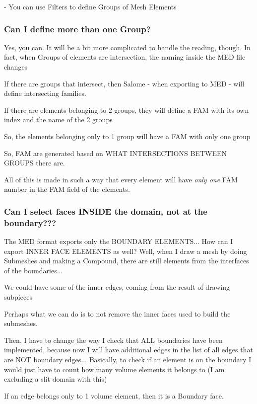 \documentclass[10pt]{book}
\begin{document}
- You can use Filters to define Groups of Mesh Elements

\subsubsection{Can I define more than one Group?}

 Yes, you can. It will be a bit more complicated to handle the reading, though.
 In fact, when Groups of elements are intersection,
 the naming inside the MED file changes
 
 If there are groups that intersect, then Salome - when exporting to MED - 
 will define intersecting families. 
 
 If there are elements belonging to 2 groups,
 they will define a FAM with its own index and the name of the 2 groups
 
 So, the elements belonging only to 1 group will have a FAM with only one group
 
 So, FAM are generated based on WHAT INTERSECTIONS BETWEEN GROUPS there are.
 
 All of this is made in such a way that every element 
 will have \textit{only one} FAM number in the FAM field of the elements.
 

\subsubsection{Can I select faces INSIDE the domain, not at the boundary???}

 The MED format exports only the BOUNDARY ELEMENTS...
 How can I export INNER FACE ELEMENTS as well?
 Well, when I draw a mesh by doing Submeshes and making a Compound,
 there are still elements from the interfaces of the boundaries...
 
 We could have some of the inner edges, coming from the result of drawing subpieces 

 Perhaps what we can do is to not remove the inner faces used to build the submeshes.
 
 Then, I have to change the way I check that ALL boundaries have been implemented,
 because now I will have additional edges in the list of all edges
 that are NOT boundary edges...
 Basically, to check if an element is on the boundary I would 
 just have to count how many volume elements it belongs to
 (I am excluding a slit domain with this)
 
 If an edge belongs only to 1 volume element, then it is a Boundary face.
 
\end{document}
